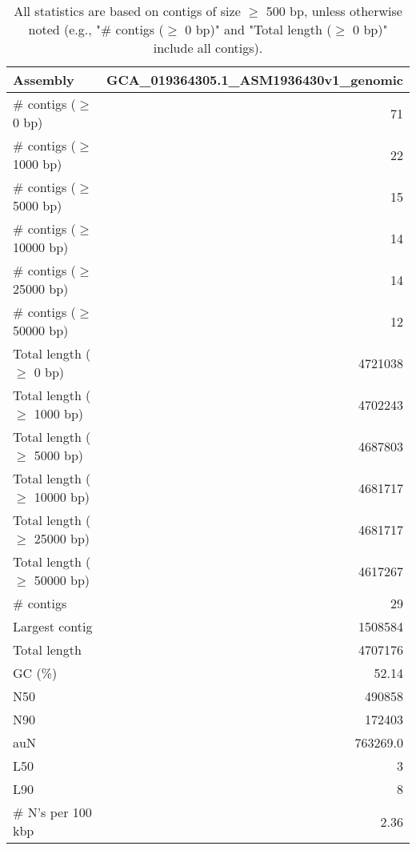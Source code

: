 \documentclass[12pt,a4paper]{article}
\begin{document}
\begin{table}[ht]
\begin{center}
\caption{All statistics are based on contigs of size $\geq$ 500 bp, unless otherwise noted (e.g., "\# contigs ($\geq$ 0 bp)" and "Total length ($\geq$ 0 bp)" include all contigs).}
\begin{tabular}{|l*{1}{|r}|}
\hline
Assembly & GCA\_019364305.1\_ASM1936430v1\_genomic \\ \hline
\# contigs ($\geq$ 0 bp) & 71 \\ \hline
\# contigs ($\geq$ 1000 bp) & 22 \\ \hline
\# contigs ($\geq$ 5000 bp) & 15 \\ \hline
\# contigs ($\geq$ 10000 bp) & 14 \\ \hline
\# contigs ($\geq$ 25000 bp) & 14 \\ \hline
\# contigs ($\geq$ 50000 bp) & 12 \\ \hline
Total length ($\geq$ 0 bp) & 4721038 \\ \hline
Total length ($\geq$ 1000 bp) & 4702243 \\ \hline
Total length ($\geq$ 5000 bp) & 4687803 \\ \hline
Total length ($\geq$ 10000 bp) & 4681717 \\ \hline
Total length ($\geq$ 25000 bp) & 4681717 \\ \hline
Total length ($\geq$ 50000 bp) & 4617267 \\ \hline
\# contigs & 29 \\ \hline
Largest contig & 1508584 \\ \hline
Total length & 4707176 \\ \hline
GC (\%) & 52.14 \\ \hline
N50 & 490858 \\ \hline
N90 & 172403 \\ \hline
auN & 763269.0 \\ \hline
L50 & 3 \\ \hline
L90 & 8 \\ \hline
\# N's per 100 kbp & 2.36 \\ \hline
\end{tabular}
\end{center}
\end{table}
\end{document}
